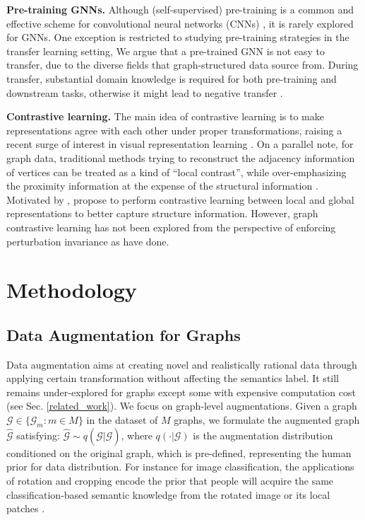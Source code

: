 \textbf{Pre-training GNNs.}
Although (self-supervised) pre-training is a common and effective scheme for convolutional neural networks (CNNs) \cite{goyal2019scaling,kolesnikov2019revisiting,chen2020simple},
it is rarely explored for GNNs.
One exception \cite{hu2019pre} is restricted to studying pre-training strategies in the transfer learning setting, 
We argue that a pre-trained GNN is not easy to transfer, due to the diverse fields that graph-structured data source from.
During transfer, substantial domain knowledge is required for both pre-training and downstream tasks, otherwise it might lead to negative transfer \cite{hu2019pre,rosenstein2005transfer}.

\textbf{Contrastive learning.}
The main idea of contrastive learning is to make representations agree with each other under proper transformations, raising a recent surge of interest in visual representation learning \cite{becker1992self,wu2018unsupervised,ye2019unsupervised,ji2019invariant,chen2020simple}.
On a parallel note, for graph data, 
traditional methods trying to reconstruct the adjacency information of vertices \cite{kipf2016variational,hamilton2017inductive} can be treated as a kind of ``local contrast'',
while over-emphasizing the proximity information at the expense of the structural information \cite{ribeiro2017struc2vec}.
Motivated by \cite{belghazi2018mine,hjelm2018learning},
\cite{ribeiro2017struc2vec,sun2019infograph,peng2020self} propose to perform contrastive learning between local and global representations to better capture structure information.
However, graph contrastive learning has not been explored from the perspective of enforcing perturbation invariance as \cite{ji2019invariant,chen2020simple} have done.

\section{Methodology}
\subsection{Data Augmentation for Graphs}
\label{sec:graph_data_augmentation}
Data augmentation aims at creating novel and realistically rational data through applying certain transformation without affecting the semantics label. It still remains  under-explored for graphs except some with expensive computation cost (see Sec. \ref{related_work}).
We focus on graph-level augmentations.  Given a graph $\mathcal{G} \in \{ \mathcal{G}_m: m \in M \}$
in the dataset of $M$ graphs,
we formulate the augmented graph $\hat{\mathcal{G}}$ satisfying: $\hat{\mathcal{G}} \sim q(\hat{\mathcal{G}} | \mathcal{G})$, 
where $q(\cdot | \mathcal{G})$ is the augmentation distribution conditioned on the original graph,
which is pre-defined, representing the human prior for data distribution. For instance for image classification, the applications of rotation and cropping encode the prior that people will acquire the same classification-based semantic knowledge from the rotated image or its local patches \cite{xie2019unsupervised,berthelot2019mixmatch}. 

